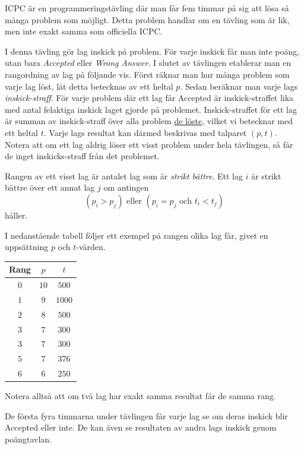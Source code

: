 
ICPC är en programmeringstävling där man får fem timmar på sig att lösa så många problem som möjligt.
Detta problem handlar om en tävling som är lik, men inte exakt samma som officiella ICPC.

I denna tävling gör lag inskick på problem.
För varje inskick får man inte poäng, utan bara \textit{Accepted} eller \textit{Wrong Answer}.
I slutet av tävlingen etablerar man en rangordning av lag på följande vis.
Först räknar man hur många problem som varje lag löst, låt detta betecknas av ett heltal $p$.
Sedan beräknar man varje lags \textit{inskick-straff}.
För varje problem där ett lag får Accepted är inskick-straffet lika med antal felaktiga inskick laget gjorde på problemet.
Inskick-straffet för ett lag är summan av inskick-straff över alla problem \underline{de löste}, vilket vi betecknar med ett heltal $t$.
Varje lags resultat kan därmed beskrivas med talparet $(p,t)$.
Notera att om ett lag aldrig löser ett visst problem under hela tävlingen, så får de inget inskicks-straff från det problemet.

Rangen av ett visst lag är antalet lag som är \textit{strikt bättre}.
Ett lag $i$ är strikt bättre över ett annat lag $j$ om antingen
$$(p_i>p_j) \text{ eller } (p_i=p_j \text{ och } t_i < t_j)$$
håller.

I nedanstående tabell följer ett exempel på rangen olika lag får, givet en uppsättning $p$ och $t$-värden.

\begin{center}
\noindent
\begin{tabular}{| c | c | c |}
  \hline
  Rang & $p$ & $t$ \\ \hline
  $0$ & $10$ & $500$ \\ \hline
  $1$ & $9$ & $1000$ \\ \hline
  $2$ & $8$ & $500$ \\ \hline
  $3$ & $7$ & $300$ \\ \hline
  $3$ & $7$ & $300$ \\ \hline
  $5$ & $7$ & $376$ \\ \hline
  $6$ & $6$ & $250$ \\ \hline
\end{tabular}
\end{center}

Notera alltså att om två lag har exakt samma resultat får de samma rang.

De första fyra timmarna under tävlingen får varje lag se om deras inskick blir Accepted eller inte.
De kan även se resultaten av andra lags inskick genom poängtavlan.

